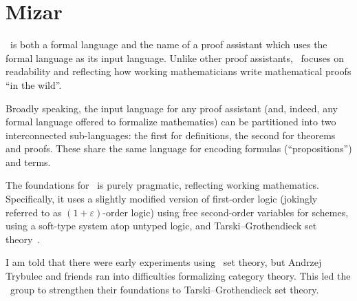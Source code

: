 \chapter{Mizar}\label{chapter:mizar}

\begin{node}\label{mizar-0000}%
\Mizar\ is both a formal language and the name of a proof assistant
which uses the formal language as its input language. Unlike other proof
assistants, \Mizar\ focuses on readability and reflecting how working
mathematicians write mathematical proofs ``in the wild''.

Broadly speaking, the input language for any proof assistant (and,
indeed, any formal language offered to formalize mathematics) can be
partitioned into two interconnected sub-languages: the first for definitions,
the second for theorems and proofs. These share the same language for
encoding formulas (``propositions'') and terms.
\end{node}

\begin{node}[Foundations]\label{mizar-0001}%
The foundations for \Mizar\ is purely pragmatic, reflecting working
mathematics. Specifically, it uses a slightly modified version of
first-order logic (jokingly referred to as $(1+\varepsilon)$-order logic)
using free second-order variables for schemes, using a soft-type system
atop untyped logic, and Tarski--Grothendieck set theory~.

I am told that there were early experiments using \MK\ set theory, but
Andrzej Trybulec and friends ran into difficulties formalizing category
theory. This led the \Mizar\ group to strengthen their foundations to
Tarski--Grothendieck set theory.
\end{node}

